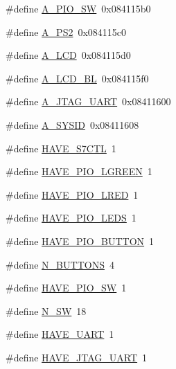 \begin{DoxyCompactItemize}
\item 
\#define \hyperlink{nios2f-de2-70_8h_a9d9fa3dd8c34516d659f2c40d2e1b72f}{\-A\-\_\-\-P\-I\-O\-\_\-\-S\-W}~0x084115b0
\item 
\#define \hyperlink{nios2f-de2-70_8h_afd2adee88ba55ceaf562bdf4b4cda1b8}{\-A\-\_\-\-P\-S2}~0x084115c0
\item 
\#define \hyperlink{nios2f-de2-70_8h_afad729c765d2caa6df62933260e90d7f}{\-A\-\_\-\-L\-C\-D}~0x084115d0
\item 
\#define \hyperlink{nios2f-de2-70_8h_a4479bac6d6cab50e5b99c3c378bd0cb7}{\-A\-\_\-\-L\-C\-D\-\_\-\-B\-L}~0x084115f0
\item 
\#define \hyperlink{nios2f-de2-70_8h_acf05caef6f63efabe8ce9f7b4ab0b40e}{\-A\-\_\-\-J\-T\-A\-G\-\_\-\-U\-A\-R\-T}~0x08411600
\item 
\#define \hyperlink{nios2f-de2-70_8h_a7fc6cc4ebdf0f1f60890deac3939e603}{\-A\-\_\-\-S\-Y\-S\-I\-D}~0x08411608
\item 
\#define \hyperlink{nios2f-de2-70_8h_a6d43f705e9f0b0596289e7d186288063}{\-H\-A\-V\-E\-\_\-\-S7\-C\-T\-L}~1
\item 
\#define \hyperlink{nios2f-de2-70_8h_a61d45ee6fd82adc049e27451fa14ca66}{\-H\-A\-V\-E\-\_\-\-P\-I\-O\-\_\-\-L\-G\-R\-E\-E\-N}~1
\item 
\#define \hyperlink{nios2f-de2-70_8h_ae539c08928a904427d22421b76136aec}{\-H\-A\-V\-E\-\_\-\-P\-I\-O\-\_\-\-L\-R\-E\-D}~1
\item 
\#define \hyperlink{nios2f-de2-70_8h_a4547c0b7f5d217308efd2620876aade4}{\-H\-A\-V\-E\-\_\-\-P\-I\-O\-\_\-\-L\-E\-D\-S}~1
\item 
\#define \hyperlink{nios2f-de2-70_8h_a6f02b8b065d322ead145ed3f53cb43f3}{\-H\-A\-V\-E\-\_\-\-P\-I\-O\-\_\-\-B\-U\-T\-T\-O\-N}~1
\item 
\#define \hyperlink{nios2f-de2-70_8h_a271dda243b0f5bd7d2053d258eb71962}{\-N\-\_\-\-B\-U\-T\-T\-O\-N\-S}~4
\item 
\#define \hyperlink{nios2f-de2-70_8h_a35e2bd3cf8fa7cd9b796056ffbd7c610}{\-H\-A\-V\-E\-\_\-\-P\-I\-O\-\_\-\-S\-W}~1
\item 
\#define \hyperlink{nios2f-de2-70_8h_af70f4bba30eb9c9f5918afca90f7ede1}{\-N\-\_\-\-S\-W}~18
\item 
\#define \hyperlink{nios2f-de2-70_8h_a050edab33688b729046aa35f51eaacd8}{\-H\-A\-V\-E\-\_\-\-U\-A\-R\-T}~1
\item 
\#define \hyperlink{nios2f-de2-70_8h_aa4a2ecab034001ed813a80bfcd5377a3}{\-H\-A\-V\-E\-\_\-\-J\-T\-A\-G\-\_\-\-U\-A\-R\-T}~1
\item 

\end{DoxyCompactItemize}
